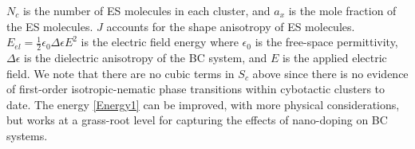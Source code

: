 \documentclass[reprint,amsfonts,amsmath,amssymb,aps,pre,floatfix,10pt]{revtex4-1}
\newcommand\n{\mathbf{n}}
\begin{document}
$N_c$ is the number of
ES molecules in each cluster, and $a_x$ is the mole fraction of
the ES molecules. $J$ accounts for the shape anisotropy of ES
molecules. $E_{el} = \frac{1}{2} \epsilon_0 \Delta \epsilon E^2$ is the electric field energy where $\epsilon_0$
is the free-space permittivity,  $\Delta \epsilon$ is the dielectric anisotropy of the BC system, and $E$ is the applied electric field. We note that there are no cubic terms in $S_c$ above since there is no evidence of first-order isotropic-nematic phase transitions within cybotactic clusters to date. The energy \eqref{Energy1} can be improved, with more physical considerations, but works at a grass-root level for capturing the effects of nano-doping on BC systems.
\end{document}
